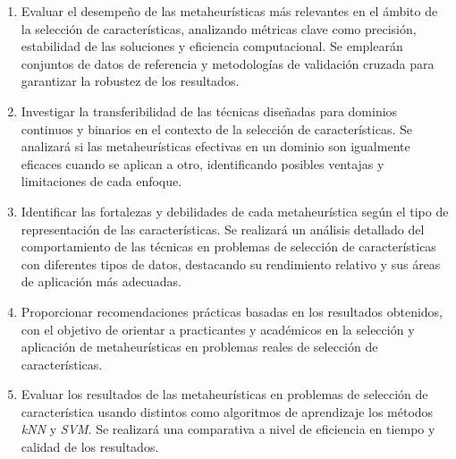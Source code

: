 \begin{enumerate}
      \item Evaluar el desempeño de las metaheurísticas más relevantes en el ámbito de la
            selección de características, analizando métricas clave como precisión, estabilidad de
            las soluciones y eficiencia computacional. Se emplearán conjuntos de datos de referencia
            y metodologías de validación cruzada para garantizar la robustez de los resultados.

      \item Investigar la transferibilidad de las técnicas diseñadas para dominios continuos y
            binarios en el contexto de la selección de características. Se analizará si las
            metaheurísticas efectivas en un dominio son igualmente eficaces cuando se aplican a
            otro, identificando posibles ventajas y limitaciones de cada enfoque.

      \item Identificar las fortalezas y debilidades de cada metaheurística según el tipo de
            representación de las características. Se realizará un análisis detallado del
            comportamiento de las técnicas en problemas de selección de características con
            diferentes tipos de datos, destacando su rendimiento relativo y sus áreas de aplicación
            más adecuadas.

      \item Proporcionar recomendaciones prácticas basadas en los resultados obtenidos, con el
            objetivo de orientar a practicantes y académicos en la selección y aplicación de
            metaheurísticas en problemas reales de selección de características.

      \item Evaluar los resultados de las metaheurísticas en problemas de selección de característica
            usando distintos como algoritmos de aprendizaje los métodos \textit{kNN} y \textit{SVM}. Se realizará
            una comparativa a nivel de eficiencia en tiempo y calidad de los resultados.
\end{enumerate}
